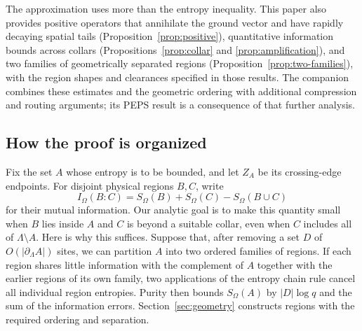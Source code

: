 The approximation uses more than the entropy inequality. This paper also
provides positive operators that annihilate the ground vector and have
rapidly decaying spatial tails (Proposition~\ref{prop:positive}),
quantitative information bounds across collars
(Propositions~\ref{prop:collar} and \ref{prop:amplification}), and
two families of geometrically separated regions
(Proposition~\ref{prop:two-families}), with the region shapes and clearances
specified in those results. The companion combines these estimates and the
geometric ordering with additional compression and routing arguments;
its PEPS result is a consequence of that further analysis.

\subsection{How the proof is organized}

Fix the set $A$ whose entropy is to be bounded, and let $Z_A$ be its
crossing-edge endpoints. For disjoint physical regions $B,C$, write
\[
 I_\Omega(B:C)=S_\Omega(B)+S_\Omega(C)-S_\Omega(B\cup C)
\]
for their mutual information. Our analytic goal is to make this quantity
small when $B$ lies inside $A$ and $C$ is beyond a suitable collar,
even when $C$ includes all of $\Lambda\setminus A$.
Here is why this suffices. Suppose that, after removing a set $D$ of
$O(|\partial_\Lambda A|)$ sites, we can partition $A$ into two ordered
families of regions. If each region shares little information with the
complement of $A$ together with the earlier regions of its own family,
two applications of the entropy chain rule cancel all individual region
entropies. Purity then bounds $S_\Omega(A)$ by $|D|\log q$ and the sum
of the information errors. Section~\ref{sec:geometry} constructs regions
with the required ordering and separation.

